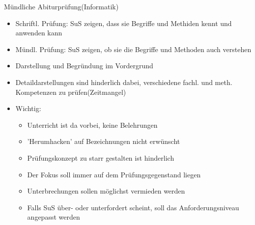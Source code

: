 \documentclass{article}
\begin{document}
\begin{block}{Mündliche Abiturprüfung(Informatik)}
    \begin{itemize}
        \item Schriftl. Prüfung: SuS zeigen, dass sie Begriffe und Methiden kennt und anwenden kann
        \item Mündl. Prüfung: SuS zeigen, ob sie die Begriffe und Methoden auch verstehen
        \item Darstellung und Begründung im Vordergrund
        \item Detaildarstellungen sind hinderlich dabei, verschiedene fachl. und meth. Kompetenzen zu prüfen(Zeitmangel)
        \item Wichtig:
        \begin{itemize}
            \item Unterricht ist da vorbei, keine Belehrungen
            \item 'Herumhacken' auf Bezeichnungen nicht erwünscht
            \item Prüfungskonzept zu starr gestalten ist hinderlich
            \item Der Fokus soll immer auf dem Prüfungsgegenstand liegen
            \item Unterbrechungen sollen möglichst vermieden werden
            \item Falls SuS über- oder unterfordert scheint, soll das Anforderungsniveau angepasst werden
        \end{itemize}
    \end{itemize}
\end{block}
\end{document}
